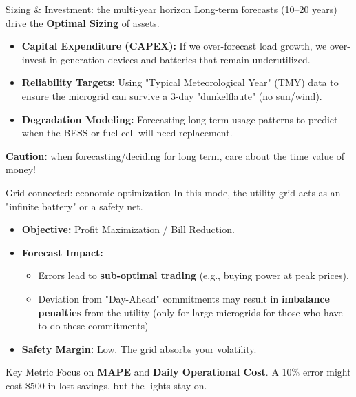 \begin{frame}{Sizing \& Investment: the multi-year horizon}
    Long-term forecasts (10–20 years) drive the \textbf{Optimal Sizing} of assets.
    \vspace{0.2cm}
    \begin{itemize}
        \item \textbf{Capital Expenditure (CAPEX):} If we over-forecast load growth, we over-invest in generation devices and batteries that remain underutilized.
        \item \textbf{Reliability Targets:} Using "Typical Meteorological Year" (TMY) data to ensure the microgrid can survive a 3-day "dunkelflaute" (no sun/wind).
        \item \textbf{Degradation Modeling:} Forecasting long-term usage patterns to predict when the BESS or fuel cell will need replacement.
    \end{itemize}
    \vspace{0.2cm}
    \textbf{Caution:} when forecasting/deciding for long term, care about the \alert{time value of money}!
\end{frame}

\begin{frame}{Grid-connected: economic optimization}
    In this mode, the utility grid acts as an "infinite battery" or a safety net.
    \begin{itemize}
        \item \textbf{Objective:} Profit Maximization / Bill Reduction.
        \item \textbf{Forecast Impact:} 
        \begin{itemize}
            \item Errors lead to \textbf{sub-optimal trading} (e.g., buying power at peak prices).
            \item Deviation from "Day-Ahead" commitments may result in \textbf{imbalance penalties} from the utility (only for large microgrids for those who have to do these commitments)
        \end{itemize}
        \item \textbf{Safety Margin:} Low. The grid absorbs your volatility.
    \end{itemize}
    \begin{exampleblock}{Key Metric}
        Focus on \textbf{MAPE} and \textbf{Daily Operational Cost}. A 10\% error might cost \$500 in lost savings, but the lights stay on.
    \end{exampleblock}
\end{frame}


